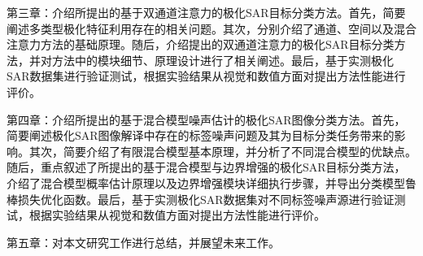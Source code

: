 第三章：介绍所提出的基于双通道注意力的极化SAR目标分类方法。首先，简要阐述多类型极化特征利用存在的相关问题。其次，分别介绍了通道、空间以及混合注意力方法的基础原理。随后，介绍提出的双通道注意力的极化SAR目标分类方法，并对方法中的模块细节、原理设计进行了相关阐述。最后，基于实测极化SAR数据集进行验证测试，根据实验结果从视觉和数值方面对提出方法性能进行评价。


第四章：介绍所提出的基于混合模型噪声估计的极化SAR图像分类方法。首先，简要阐述极化SAR图像解译中存在的标签噪声问题及其为目标分类任务带来的影响。其次，简要介绍了有限混合模型基本原理，并分析了不同混合模型的优缺点。随后，重点叙述了所提出的基于混合模型与边界增强的极化SAR目标分类方法，介绍了混合模型概率估计原理以及边界增强模块详细执行步骤，并导出分类模型鲁棒损失优化函数。最后，基于实测极化SAR数据集对不同标签噪声源进行验证测试，根据实验结果从视觉和数值方面对提出方法性能进行评价。



第五章：对本文研究工作进行总结，并展望未来工作。